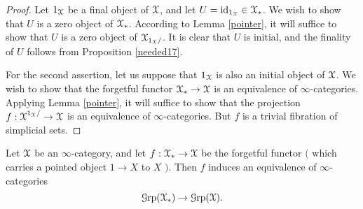 \begin{proof}
Let $1_{\operatorname{\mathcal{X}}}$ be a final object of $\operatorname{\mathcal{X}}$, and let $U = \operatorname{id}_{1_{\operatorname{\mathcal{X}}}} \in \operatorname{\mathcal{X}}_{\ast}$. 
We wish to show that $U$ is a zero object of $\operatorname{\mathcal{X}}_{\ast}$. According to Lemma \ref{pointer}, 
it will suffice to show that $U$ is a zero object
of $\operatorname{\mathcal{X}}_{1_{\operatorname{\mathcal{X}}}/}$. It is clear that $U$ is initial, and the finality of $U$ follows from
Proposition \ref{needed17}. 

For the second assertion, let us suppose that $1_{\operatorname{\mathcal{X}}}$ is also an initial object of $\operatorname{\mathcal{X}}$.
We wish to show that the forgetful functor $\operatorname{\mathcal{X}}_{\ast} \rightarrow \operatorname{\mathcal{X}}$ is an equivalence of $\infty$-categories. Applying Lemma \ref{pointer}, it will suffice to show that the projection
$f: \operatorname{\mathcal{X}}^{1_{\operatorname{\mathcal{X}}}/} \rightarrow \operatorname{\mathcal{X}}$ is an equivalence of $\infty$-categories. 
But $f$ is a trivial fibration of simplicial sets.
\end{proof}

\begin{lemma}\label{postEM}
Let $\operatorname{\mathcal{X}}$ be an $\infty$-category, and let $f: \operatorname{\mathcal{X}}_{\ast} \rightarrow \operatorname{\mathcal{X}}$
be the forgetful functor $($ which carries a pointed object $1 \rightarrow X$ to $X$ $)$.
Then $f$ induces an equivalence of $\infty$-categories
$$ \operatorname{\mathcal{G}rp}( \operatorname{\mathcal{X}}_{\ast}) \rightarrow \operatorname{\mathcal{G}rp}( \operatorname{\mathcal{X}}).$$
\end{lemma}

